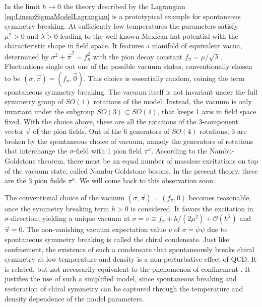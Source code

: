 In the limit ${h\to0}$ the theory described by the Lagrangian \eqref{eq:LinearSigmaModelLagrangian} is a prototypical example for spontaneous symmetry breaking. At sufficiently low temperatures the parameters satisfy ${\mu^2>0}$ and ${\lambda>0}$ leading to the well known Mexican hat potential with the characteristic shape in field space. It features a manifold of equivalent vacua, determined by $\sigma^2+\vec{\pi}^2=f_\pi^2$ with the pion decay constant ${f_\pi=\mu/\sqrt{\lambda}}$. Fluctuations single out one of the possible vacuum states, conventionally chosen to be $(\sigma,\vec{\pi})=(f_\pi,\vec{0})$. This choice is essentially random, coining the term spontaneous symmetry breaking. The vacuum itself is not invariant under the full symmetry group of $SO(4)$ rotations of the model. Instead, the vacuum is only invariant under the subgroup ${SO(3)\subset SO(4)}$, that keeps 1 axis in field space fixed. With the choice above, these are all the rotations of the 3-component vector $\vec{\pi}$ of the pion fields. Out of the 6 generators of $SO(4)$ rotations, 3 are broken by the spontaneous choice of vacuum, namely the generators of rotations that interchange the $\sigma$-field with 1 pion field $\pi^a$. According to the Nambu-Goldstone theorem, there must be an equal number of massless excitations on top of the vacuum state, called Nambu-Goldstone bosons. In the present theory, these are the 3 pion fields $\pi^a$. We will come back to this observation soon.

The conventional choice of the vacuum ${(\sigma,\vec{\pi})=(f_\pi,0)}$ becomes reasonable, once the symmetry breaking term $h>0$ is considered. It favors the excitation in $\sigma$-direction, yielding a unique vacuum at ${\sigma=v\equiv f_\pi+h/(2\mu^2)+\mathcal{O}(h^2)}$ and $\vec{\pi}=0$. The non-vanishing vacuum expectation value $v$ of ${\sigma=\overline{\psi}\psi}$ due to spontaneous symmetry breaking is called the chiral condensate. Just like confinement, the existence of such a condensate that spontaneously breaks chiral symmetry at low temperature and density is a non-perturbative effect of QCD. It is related, but not necessarily equivalent to the phenomenon of confinement \cite{EvansRigatos_2021}. It justifies the use of such a simplified model, since spontaneous breaking and restoration of chiral symmetry can be captured through the temperature and density dependence of the model parameters.

